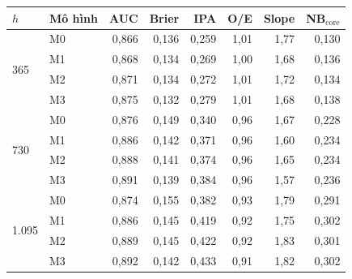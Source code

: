 \begin{tabular}{@{}llrrrrrr@{}}
\toprule
$h$ & Mô hình & AUC & Brier & IPA & O/E & Slope & NB$_{\text{core}}$\\
\midrule
\multirow{4}{*}{365} & M0 & 0,866 & 0,136 & 0,259 & 1,01 & 1,77 & 0,130\\
 & M1 & 0,868 & 0,134 & 0,269 & 1,00 & 1,68 & 0,136\\
 & M2 & 0,871 & 0,134 & 0,272 & 1,01 & 1,72 & 0,134\\
 & M3 & 0,875 & 0,132 & 0,279 & 1,01 & 1,68 & 0,138\\
\midrule
\multirow{4}{*}{730} & M0 & 0,876 & 0,149 & 0,340 & 0,96 & 1,67 & 0,228\\
 & M1 & 0,886 & 0,142 & 0,371 & 0,96 & 1,60 & 0,234\\
 & M2 & 0,888 & 0,141 & 0,374 & 0,96 & 1,65 & 0,234\\
 & M3 & 0,891 & 0,139 & 0,384 & 0,96 & 1,57 & 0,236\\
\midrule
\multirow{4}{*}{1.095} & M0 & 0,874 & 0,155 & 0,382 & 0,93 & 1,79 & 0,291\\
 & M1 & 0,886 & 0,145 & 0,419 & 0,92 & 1,75 & 0,302\\
 & M2 & 0,889 & 0,145 & 0,422 & 0,92 & 1,83 & 0,301\\
 & M3 & 0,892 & 0,142 & 0,433 & 0,91 & 1,82 & 0,302\\
\bottomrule
\end{tabular}

